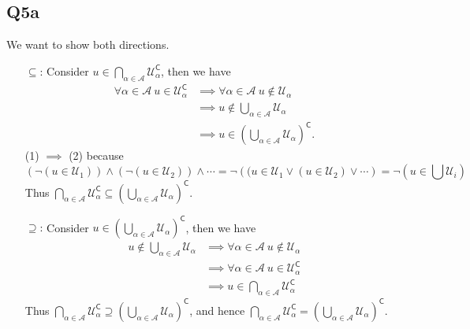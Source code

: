 \documentclass[12pt, lettersize]{article}
\newcommand{\com}{\mathsf{C}}
\begin{document}
	\subsection*{Q5a}
	We want to show both directions.
	\begin{itemize}
		\item[$\subseteq$:] Consider $u\in\bigcap_{\alpha\in\mathcal{A}}\mathcal{U}_{\alpha}^{\com}$, then we have
		\begin{align}
			\forall\alpha\in\mathcal{A}\ u\in\mathcal{U}_{\alpha}^{\com}&\implies\forall\alpha\in\mathcal{A}\ u\notin\mathcal{U}_{\alpha}\\
			&\implies u\notin \bigcup_{\alpha\in\mathcal{A}}\mathcal{U}_\alpha\\
			&\implies u\in\left(\bigcup_{\alpha\in\mathcal{A}}\mathcal{U}_\alpha\right)^\com.
		\end{align}
		(1) $\implies$ (2) because
		\begin{displaymath}
			\left(\neg\left(u\in\mathcal{U}_1\right)\right)\land\left(\neg\left(u\in\mathcal{U}_2\right)\right)\land\cdots=\neg\left((u\in\mathcal{U}_1\lor(u\in\mathcal{U}_2)\lor\cdots\right)=\neg\left(u\in\bigcup\mathcal{U}_i\right)
		\end{displaymath} 
		Thus $\bigcap_{\alpha\in\mathcal{A}}\mathcal{U}_{\alpha}^{\com}\subseteq\left(\bigcup_{\alpha\in\mathcal{A}}\mathcal{U}_\alpha\right)^\com$.
		\item[$\supseteq$:] Consider $u\in\left(\bigcup_{\alpha\in\mathcal{A}}\mathcal{U}_\alpha\right)^\com$, then we have
		\begin{align*}
			u\notin\bigcup_{\alpha\in\mathcal{A}}\mathcal{U}_\alpha &\implies\forall\alpha\in\mathcal{A}\ u\notin\mathcal{U}_\alpha\\
			&\implies\forall\alpha\in\mathcal{A}\ u\in\mathcal{U}_{\alpha}^{\com}\\
			&\implies u\in\bigcap_{\alpha\in\mathcal{A}}\mathcal{U}_{\alpha}^{\com}
		\end{align*}
		Thus $\bigcap_{\alpha\in\mathcal{A}}\mathcal{U}_{\alpha}^{\com}\supseteq\left(\bigcup_{\alpha\in\mathcal{A}}\mathcal{U}_\alpha\right)^\com$, and hence $\bigcap_{\alpha\in\mathcal{A}}\mathcal{U}_{\alpha}^{\com}=\left(\bigcup_{\alpha\in\mathcal{A}}\mathcal{U}_\alpha\right)^\com$.
	\end{itemize}
	

	
\end{document}
